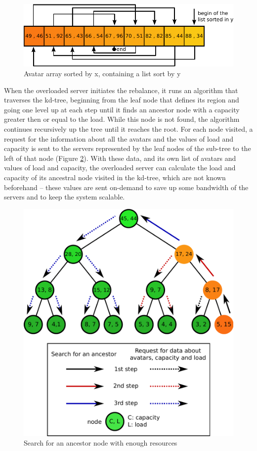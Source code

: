 \documentclass[acmjacm]{acmtrans2m}
\begin{document}
\begin{figure}
  \centering
  \includegraphics[width=0.9\linewidth]{images/vectorxlisty}
  \caption{Avatar array sorted by x, containing a list sort by y}
   \label{fig:vectorxlisty}
\end{figure}

When the overloaded server initiates the rebalance, it runs an algorithm that traverses the kd-tree, beginning from the leaf node that defines its region and going one level up at each step until it finds an ancestor node with a capacity greater then or equal to the load. While this node is not found, the algorithm continues recursively up the tree until it reaches the root. For each node visited, a request for the information about all the avatars and the values of load and capacity is sent to the servers represented by the leaf nodes of the sub-tree to the left of that node (Figure \ref{fig:ancestors}). With these data, and its own list of avatars and values of load and capacity, the overloaded server can calculate the load and capacity of its ancestral node visited in the kd-tree, which are not known beforehand -- these values are sent on-demand to save up some bandwidth of the servers and to keep the system scalable.

\begin{figure}
  \centering
  \includegraphics[width=0.8\linewidth]{images/ancestors}
  \caption{Search for an ancestor node with enough resources}
   \label{fig:ancestors}
\end{figure}
\end{document}
